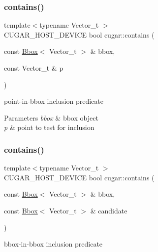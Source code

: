 \subsubsection{\texorpdfstring{contains()}{contains()}\hspace{0.1cm}{\footnotesize\ttfamily [1/2]}}
{\footnotesize\ttfamily template$<$typename Vector\+\_\+t $>$ \\
C\+U\+G\+A\+R\+\_\+\+H\+O\+S\+T\+\_\+\+D\+E\+V\+I\+CE bool cugar\+::contains (\begin{DoxyParamCaption}\item[{const \hyperlink{structcugar_1_1_bbox}{Bbox}$<$ Vector\+\_\+t $>$ \&}]{bbox,  }\item[{const Vector\+\_\+t \&}]{p }\end{DoxyParamCaption})\hspace{0.3cm}{\ttfamily [inline]}}

point-\/in-\/bbox inclusion predicate


\begin{DoxyParams}{Parameters}
{\em bbox} & bbox object \\
\hline
{\em p} & point to test for inclusion \\
\hline
\end{DoxyParams}
\mbox{\label{group___bbox_module_gaeb563052dce95e32012796563ea7f611}} 
\subsubsection{\texorpdfstring{contains()}{contains()}\hspace{0.1cm}{\footnotesize\ttfamily [2/2]}}
{\footnotesize\ttfamily template$<$typename Vector\+\_\+t $>$ \\
C\+U\+G\+A\+R\+\_\+\+H\+O\+S\+T\+\_\+\+D\+E\+V\+I\+CE bool cugar\+::contains (\begin{DoxyParamCaption}\item[{const \hyperlink{structcugar_1_1_bbox}{Bbox}$<$ Vector\+\_\+t $>$ \&}]{bbox,  }\item[{const \hyperlink{structcugar_1_1_bbox}{Bbox}$<$ Vector\+\_\+t $>$ \&}]{candidate }\end{DoxyParamCaption})\hspace{0.3cm}{\ttfamily [inline]}}

bbox-\/in-\/bbox inclusion predicate



